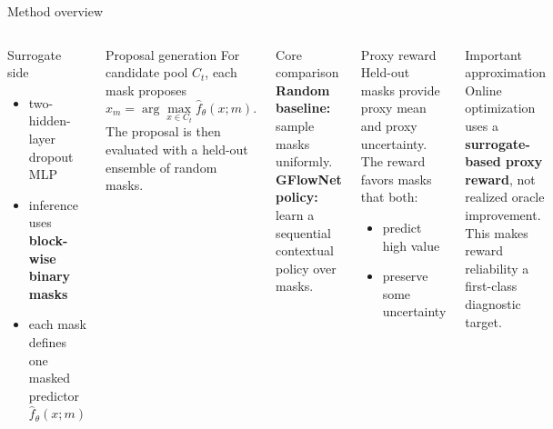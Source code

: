 \documentclass[aspectratio=169]{beamer}
\begin{document}
\begin{frame}{Method overview}
\vspace{-0.55em}
\begin{columns}[T,onlytextwidth]
\begin{minipage}[t][0.82\textheight]{\linewidth}\vspace{0pt}
  \begin{cardA}{Surrogate side}
  \begin{itemize}
    \item two-hidden-layer dropout MLP
    \item inference uses \textbf{block-wise binary masks}
    \item each mask defines one masked predictor $\hat f_\theta(x;m)$
  \end{itemize}
  \end{cardA}

  \vfill

  \begin{card}{Proposal generation}
  For candidate pool $C_t$, each mask proposes
  \[
  x_m=\arg\max_{x\in C_t}\hat f_\theta(x;m).
  \]
  The proposal is then evaluated with a held-out ensemble of random masks.
  \end{card}

  \vfill

  \begin{cardG}{Core comparison}
  \textbf{Random baseline:} sample masks uniformly.\\
  \textbf{GFlowNet policy:} learn a sequential contextual policy over masks.
  \end{cardG}
\end{minipage}

\begin{minipage}[t][0.82\textheight]{\linewidth}\vspace{0pt}
  \begin{card}{Proxy reward}
  Held-out masks provide proxy mean and proxy uncertainty. The reward favors masks that both:
  \begin{itemize}
    \item predict high value
    \item preserve some uncertainty
  \end{itemize}
  \end{card}

  \vfill

  \begin{cardW}{Important approximation}
  Online optimization uses a \textbf{surrogate-based proxy reward}, not realized oracle improvement. This makes reward reliability a first-class diagnostic target.
  \end{cardW}


\end{minipage}
\end{columns}
\end{frame}
\end{document}
